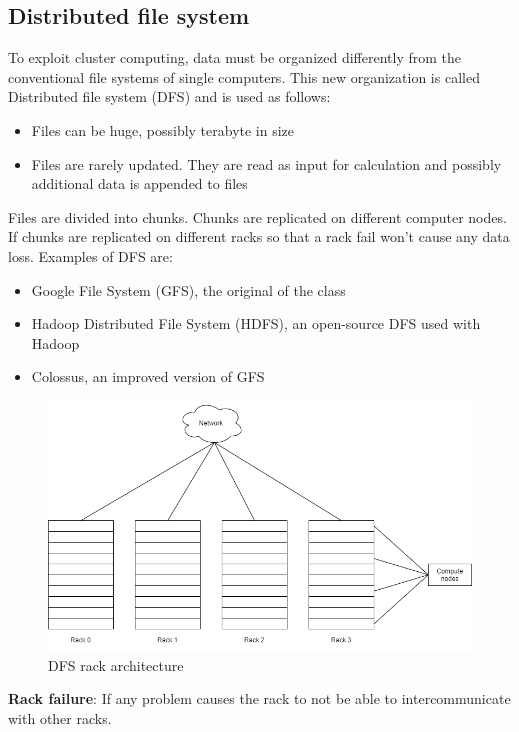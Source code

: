 \documentclass[\main/main.tex]{subfiles}
\begin{document}
\subsection{Distributed file system}
To exploit cluster computing, data must be organized differently from the conventional file systems of single computers. This new organization is called Distributed file system (DFS) and is used as follows:
\begin{itemize}
    \item Files can be huge, possibly terabyte in size
    \item Files are rarely updated. They are read as input for calculation and possibly additional data is appended to files
\end{itemize}
Files are divided into chunks. Chunks are replicated on different computer nodes. If chunks are replicated on different racks so that a rack fail won't cause any data loss.
Examples of DFS are:
\begin{itemize}
    \item Google File System (GFS), the original of the class
    \item Hadoop Distributed File System (HDFS), an open-source DFS used with Hadoop
    \item Colossus, an improved version of GFS
\end{itemize}
\begin{figure}[h]
    \centering
    \includegraphics[scale=0.35]{images/cluster_computing/racks_dfs.png}
    \caption{DFS rack architecture}
    \label{fig:racks_dfs}
\end{figure}
\textbf{Rack failure}: If any problem causes the rack to not be able to intercommunicate with other racks.
\end{document}
